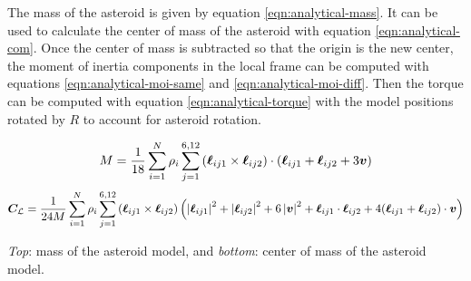 \documentclass[aps,twocolumn,secnumarabic,balancelastpage,amsmath,amssymb,nofootinbib,floatfix]{revtex4-1}
\begin{document}
The mass of the asteroid is given by equation \ref{eqn:analytical-mass}. It can be used to calculate the center of mass of the asteroid with equation \ref{eqn:analytical-com}. Once the center of mass is subtracted so that the origin is the new center, the moment of inertia components in the local frame can be computed with equations \ref{eqn:analytical-moi-same} and  \ref{eqn:analytical-moi-diff}. Then the torque can be computed with equation \ref{eqn:analytical-torque} with the model positions rotated by $R$ to account for asteroid rotation.

\begin{table*} 
    \begin{equation}
        M = \frac{1}{18}\sum_{i=1}^N\rho_i \sum_{j=1}^{6, 12} \left( \bm\ell_{ij1} \times \bm\ell_{ij2} \right) \cdot (\bm \ell_{ij1} + \bm \ell_{ij2} + 3\bm v)
        \label{eqn:analytical-mass}
    \end{equation}
    \begin{equation}
        \bm C_\mathcal{L} = \frac{1}{24M}\sum_{i=1}^N\rho_i \sum_{j=1}^{6, 12} \left( \bm\ell_{ij1} \times \bm\ell_{ij2} \right) \left( \left| \bm\ell_{ij1} \right|^2  + \left| \bm\ell_{ij2} \right|^2 + 6\left| \bm v \right|^2 + \bm\ell_{ij1} \cdot \bm\ell_{ij2} + 4(\bm \ell_{ij1} + \bm \ell_{ij2})\cdot \bm v \right)
        \label{eqn:analytical-com}
    \end{equation}
    \caption*{\textit{Top}: mass of the asteroid model, and \textit{bottom}: center of mass of the asteroid model. }
\end{table*}
\end{document}
